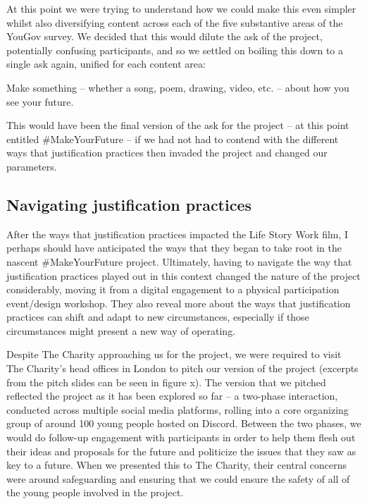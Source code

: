 At this point we were trying to understand how we could make this even simpler whilst also diversifying content across each of the five substantive areas of the YouGov survey. We decided that this would dilute the ask of the project, potentially confusing participants, and so we settled on boiling this down to a single ask again, unified for each content area:

Make something – whether a song, poem, drawing, video, etc. – about how you see your future. 

This would have been the final version of the ask for the project – at this point entitled \#MakeYourFuture – if we had not had to contend with the different ways that justification practices then invaded the project and changed our parameters. 

\subsection{Navigating justification practices}

After the ways that justification practices impacted the Life Story Work film, I perhaps should have anticipated the ways that they began to take root in the nascent \#MakeYourFuture project.  Ultimately, having to navigate the way that justification practices played out in this context changed the nature of the project considerably, moving it from a digital engagement to a physical participation event/design workshop. They also reveal more about the ways that justification practices can shift and adapt to new circumstances, especially if those circumstances might present a new way of operating. 

Despite The Charity approaching us for the project, we were required to visit The Charity’s head offices in London to pitch our version of the project (excerpts from the pitch slides can be seen in figure x). The version that we pitched reflected the project as it has been explored so far – a two-phase interaction, conducted across multiple social media platforms, rolling into a core organizing group of around 100 young people hosted on Discord. Between the two phases, we would do follow-up engagement with participants in order to help them flesh out their ideas and proposals for the future and politicize the issues that they saw as key to a future. When we presented this to The Charity, their central concerns were around safeguarding and ensuring that we could ensure the safety of all of the young people involved in the project. 

